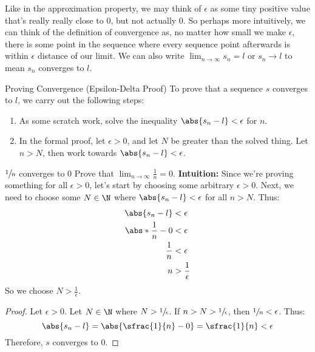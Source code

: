 Like in the approximation property, we may think of $\epsilon$ as some tiny positive value that's really really close to $0$, but not actually $0$. So perhaps more intuitively, we can think of the definition of convergence as, no matter how small we make $\epsilon$, there is some point in the sequence where every sequence point afterwards is within $\epsilon$ distance of our limit. We can also write $\lim_{n \to \infty} s_n = l$ or $s_n \to l$ to mean $s_n$ converges to $l$.

\begin{tecbox}{Proving Convergence (Epsilon-Delta Proof)}{}
    To prove that a sequence $s$ converges to $l$, we carry out the following steps:
    \begin{enumerate}
        \item As some scratch work, solve the inequality $\abs{s_n - l} < \epsilon$ for $n$.
        \item In the formal proof, let $\epsilon > 0$, and let $N$ be greater than the solved thing. Let $n > N$, then work towards $\abs{s_n - l} < \epsilon$.
    \end{enumerate}
\end{tecbox}

\begin{exbox}{$\sfrac{1}{n}$ converges to $0$}{}
    Prove that $\lim_{n \to \infty} \frac{1}{n} = 0$.
    \tcblower
    \textbf{Intuition:} Since we're proving something for all $\epsilon > 0$, let's start by choosing some arbitrary $\epsilon > 0$. Next, we need to choose some $N \in \N$ where $\abs{s_n - l} < \epsilon$ for all $n > N$. Thus:
    \begin{align*}
        \abs{s_n - l} &< \epsilon \\
        \abs*{\frac{1}{n} - 0} &< \epsilon \\
        \frac{1}{n} &< \epsilon \\
        n &> \frac{1}{\epsilon}
    \end{align*}
    So we choose $N > \frac{1}{\epsilon}$.

    \begin{proof}
        Let $\epsilon > 0$. Let $N \in \N$ where $N > \sfrac{1}{\epsilon}$. If $n > N > \sfrac{1}{\epsilon}$, then $\sfrac{1}{n} < \epsilon$. Thus:
        \[ \abs{s_n - l} = \abs{\sfrac{1}{n} - 0} = \sfrac{1}{n} < \epsilon \]
        Therefore, $s$ converges to $0$.
    \end{proof}
\end{exbox}

